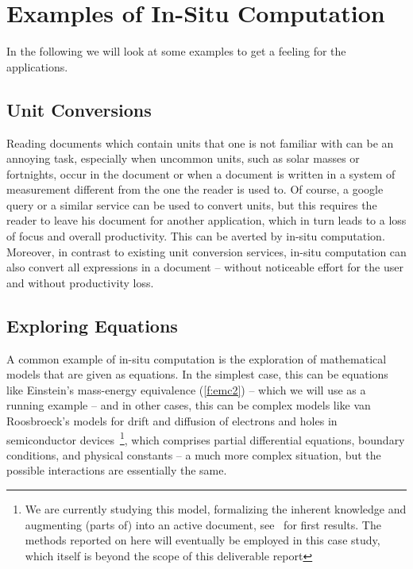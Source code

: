 \section{Examples of In-Situ Computation}\label{sec:examples}

In the following we will look at some examples to get a feeling for the applications.

\subsection{Unit Conversions}\label{sec:ex:units}
Reading documents which contain units that one is not familiar with can be an annoying
task, especially when uncommon units, such as solar masses or fortnights, occur in the
document or when a document is written in a system of measurement different from the one
the reader is used to.  Of course, a google query or a similar service can be used to
convert units, but this requires the reader to leave his document for another application,
which in turn leads to a loss of focus and overall productivity.  This can be averted by
in-situ computation. Moreover, in contrast to existing unit conversion services, in-situ
computation can also convert all expressions in a document -- without noticeable effort
for the user and without productivity loss.


\subsection{Exploring Equations}\label{sec:ex:equations}

A common example of in-situ computation is the exploration of mathematical models that are
given as equations. In the simplest case, this can be equations like Einstein's
mass-energy equivalence (\ref{f:emc2}) -- which we will use as a running example -- and in
other cases, this can be complex models like van Roosbroeck's models for drift and
diffusion of electrons and holes in semiconductor devices~\cite{FarRotDoa:nmddm16}\footnote{We
  are currently studying this model, formalizing the inherent knowledge and augmenting
  (parts of) \cite{FarRotDoa:nmddm16} into an active document, see~\cite{KohKopMueTab:RCS} for
  first results. The methods reported on here will eventually be employed in this case
  study, which itself is beyond the scope of this deliverable report}, which comprises
partial differential equations, boundary conditions, and physical constants -- a much more
complex situation, but the possible interactions are essentially the same. 

